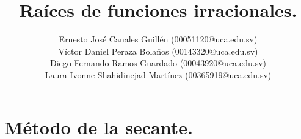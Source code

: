 \documentclass[9pt,technote]{IEEEtran}
\title{Raíces de funciones irracionales.}
\author{
    Ernesto José Canales Guillén (00051120@uca.edu.sv)\\
    Víctor Daniel Peraza Bolaños (00143320@uca.edu.sv)\\
    Diego Fernando Ramos Guardado (00043920@uca.edu.sv)\\
    Laura Ivonne Shahidinejad Martínez (00365919@uca.edu.sv)
}
\numberwithin{equation}{section}
\begin{document}
\maketitle
\tableofcontents
\section{Método de la secante.}

\clearpage






\clearpage







\clearpage











\end{document}
